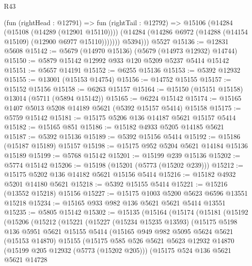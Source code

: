 \begin{lexlean}{R43}
\begin{coremodule}
            (fun (rightHead : @12791) =>
            fun (rightTail : @12792) =>
            @15106
              (@14284 (@15108 (@14289 (@12901 @15110))))
              (@14284 (@14286 @6972 (@14288 (@14154 @15109) (@12900 @6977 @15110)))))))
          @5394)))
    @5527
@15136 := @12831 @5608
@15142 := @5679 (@14970 @15136) (@5679 (@14973 @12932) @14744)
@15150 := @5879 @15142 @12992 @933 @120 @5209 @5237 @5414 @15142
@15151 := @5657 @14191
@15152 := @6255 @15136
@15153 := @5392 @12932
@15155 := @13001 (@15153 @14754)
@15156 := @14752 @15155
@15157 := @15152 @15156
@15158 := @6263 @15157
@15164 := @15150 (@15151 @15158) @13014 (@5711 (@5894 @15142))
@15165 := @6224 @15142
@15174 := @15165 @1407 @5013 @5208 @14189 @5621 (@5392 @15157 @5414) @15158
@15175 := @5759 @15142
@15181 := @15175 @5206 @136 @14187 @5621 @15157 @5414
@15182 := @15165 @851
@15186 := @15182 @4933 @5205 @14185 @5621
@15187 := @5392 @15136
@15189 := @5392 @15156 @5414
@15192 := @15186 (@15187 @15189) @15157
@15198 := @15175 @952 @5204 @5621 @14184 @15136 @15189
@15199 := @5768 @15142
@15201 := @15199 @239 @15136
@15202 := @5774 @15142
@15206 := @15198 (@15201 (@5773 (@15202 @239)))
@15212 := @15175 @5202 @136 @14182 @5621 @15156 @5414
@15216 := @15182 @4932 @5201 @14180 @5621
@15218 := @5392 @15155 @5414
@15221 := @15216 (@13552 @15218) @15156
@15227 := @15175 @1003 @5200 @5623 @6596 @13551 @15218
@15234 := @15165 @933 @982 @136 @5621 @5621 @5414 @13551
@15235 := @5805 @15142
@15302 := @15135
    (@15164
      (@15174
        (@15181
          (@15192
            (@15206
              (@15212
                (@15221
                  (@15227
                    (@15234 @15235 @13593)
                    (@15175
                      @5198
                      @136
                      @5951
                      @5621
                      @15155
                      @5414
                      (@15165
                        @949
                        @982
                        @5095
                        @5624
                        @5621
                        (@15153 @14870)
                        @15155
                        (@15175
                          @585
                          @526
                          @5621
                          @5623
                          @12932
                          @14870
                          (@15199 @205 @12932 (@5773 (@15202 @205)))
                          (@15175
                            @524
                            @136
                            @5621
                            @5621
                            @14728

\end{coremodule}
\end{lexlean}
